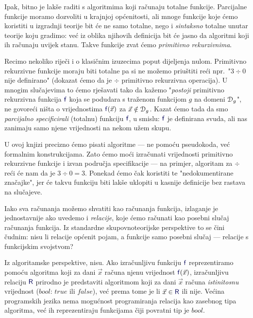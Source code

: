 Ipak, bitno je lakše raditi s algoritmima koji računaju totalne funkcije. Parcijalne funkcije moramo dozvoliti u krajnjoj općenitosti, ali mnoge funkcije koje ćemo koristiti u izgradnji teorije bit će ne samo totalne, nego i \emph{sintaksno} totalne unutar teorije koju gradimo: već iz oblika njihovih definicija bit će jasno da algoritmi koji ih računaju uvijek stanu. Takve funkcije zvat ćemo \emph{primitivno rekurzivnima}.

Recimo nekoliko riječi i o klasičnim izuzecima poput dijeljenja nulom. Primitivno rekurzivne funkcije moraju biti totalne pa si ne možemo priuštiti reći npr.\ "$3\div0$ nije definirano" (dokazat ćemo da je $\div$ primitivno rekurzivna operacija). U mnogim slučajevima to ćemo rješavati tako da kažemo "\emph{postoji} primitivno rekurzivna funkcija $\f{f}$ koja se podudara s traženom funkcijom $g$ na domeni $\mathcal D_{g}$", ne govoreći ništa o vrijednostima $\f{f}(\vec x)$ za $\vec x\notin\mathcal D_{g}$. %
Kazat ćemo tada da smo \emph{parcijalno specificirali} (totalnu) funkciju $\f{f}$, u smislu: $\f{f}$ je definirana svuda, ali nas zanimaju samo njene vrijednosti na nekom užem skupu.

U ovoj knjizi precizno ćemo pisati algoritme --- ne pomoću pseudokoda, već formalnim konstrukcijama. Zato ćemo moći izračunati vrijednosti primitivno rekurzivne funkcije i izvan područja specifikacije --- na primjer, algoritam za $\div$ reći će nam da je $3\div 0=3$. Ponekad ćemo čak koristiti te "nedokumentirane značajke", jer će takvu funkciju biti lakše uklopiti u kasnije definicije bez rastava na slučajeve. %


Iako sva računanja možemo shvatiti kao računanja funkcija, izlaganje je jednostavnije ako uvedemo i \emph{relacije}, koje ćemo računati kao posebni slučaj računanja funkcija. Iz standardne skupovnoteorijske perspektive to se čini čudnim: nisu li relacije općenit pojam, a funkcije samo posebni slučaj --- relacije s funkcijskim svojstvom?

Iz algoritamske perspektive, nisu. Ako izračunljivu funkciju $\f{f}$ reprezentiramo po\-mo\-ću algoritma koji za dani $\vec x$ računa njenu vrijednost $\f{f}(\vec x)$, izračunljivu relaciju $\f{R}$ prirodno je predstaviti algoritmom koji za dani $\vec x$ računa \emph{istinitosnu} vrijednost ($bool$: $\mathit{true}$ ili $\mathit{false}$), već prema tome je li $\vec x\in\f{R}$ ili nije. Većina programskih jezika nema mogućnost programiranja relacija kao zasebnog tipa algoritma, već ih reprezentiraju funkcijama čiji povratni tip je $bool$.

